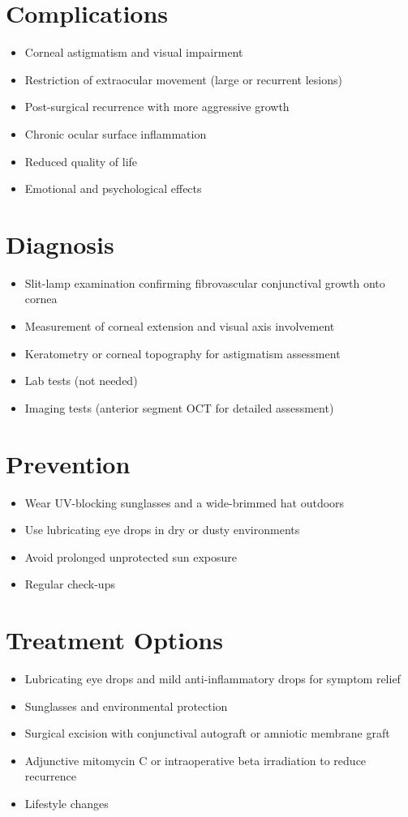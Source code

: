 \section{Complications}
\begin{itemize}[noitemsep]
  \item Corneal astigmatism and visual impairment
  \item Restriction of extraocular movement (large or recurrent lesions)
  \item Post-surgical recurrence with more aggressive growth
  \item Chronic ocular surface inflammation
  \item Reduced quality of life
  \item Emotional and psychological effects
\end{itemize}

\section{Diagnosis}
\begin{itemize}[noitemsep]
  \item Slit-lamp examination confirming fibrovascular conjunctival growth onto cornea
  \item Measurement of corneal extension and visual axis involvement
  \item Keratometry or corneal topography for astigmatism assessment
  \item Lab tests (not needed)
  \item Imaging tests (anterior segment OCT for detailed assessment)
\end{itemize}

\section{Prevention}
\begin{itemize}[noitemsep]
  \item Wear UV-blocking sunglasses and a wide-brimmed hat outdoors
  \item Use lubricating eye drops in dry or dusty environments
  \item Avoid prolonged unprotected sun exposure
  \item Regular check-ups
\end{itemize}

\section{Treatment Options}
\begin{itemize}[noitemsep]
  \item Lubricating eye drops and mild anti-inflammatory drops for symptom relief
  \item Sunglasses and environmental protection
  \item Surgical excision with conjunctival autograft or amniotic membrane graft
  \item Adjunctive mitomycin C or intraoperative beta irradiation to reduce recurrence
  \item Lifestyle changes
\end{itemize}

